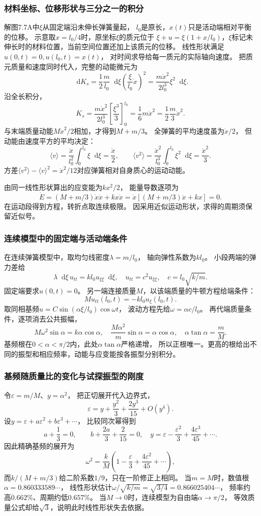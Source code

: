 \documentclass[UTF8,fontset=fandol,a4paper,11pt]{ctexart}
\newcommand{\dd}{\mathop{}\!\mathrm{d}}
\begin{document}
\subsubsection*{材料坐标、位移形状与三分之一的积分}
解图7.7A中$\xi$从固定端沿未伸长弹簧量起，
$l_0$是原长，$x(t)$只是活动端相对平衡的位移。
示意取$x=l_0/4$时，原坐标$\xi$的质元位于
$\xi+u=\xi(1+x/l_0)$，$\xi$标记未伸长时的材料位置，当前空间位置还加上该质元的位移。
线性形状满足$u(0,t)=0,u(l_0,t)=x(t)$，
对时间求导给每一质元的实际轴向速度。
把质元质量和速度同时代入，完整的动能微元为
\[
\dd K_s=\frac12\frac m{l_0}\dd\xi
\left(\frac\xi{l_0}\dot x\right)^2
=\frac{m\dot x^2}{2l_0^3}\xi^2\dd\xi.
\]
沿全长积分，
\[
K_s=\frac{m\dot x^2}{2l_0^3}
\left[\frac{\xi^3}{3}\right]_0^{l_0}
=\frac16m\dot x^2=\frac12\frac m3\dot x^2.
\]
与末端质量动能$M\dot x^2/2$相加，才得到$M+m/3$。
全弹簧的平均速度虽为$\dot x/2$，
但动能由速度平方的平均决定：
\[
\langle v\rangle=\frac{\dot x}{l_0^2}\int_0^{l_0}\xi\dd\xi=\frac{\dot x}{2},
\qquad
\langle v^2\rangle=\frac{\dot x^2}{l_0^3}\int_0^{l_0}\xi^2\dd\xi=\frac{\dot x^2}{3}.
\]
方差$\langle v^2\rangle-\langle v\rangle^2=\dot x^2/12$对应弹簧相对自身质心的运动动能。

由同一线性形状算出的应变能为$kx^2/2$，
能量导数逐项为
\[
\dot E=(M+m/3)\dot x\ddot x+kx\dot x
=\dot x[(M+m/3)\ddot x+kx]=0.
\]
在运动段得到方程，转折点取连续极限。
因采用近似运动形状，求得的周期须保留近似号。

\subsubsection*{连续模型中的固定端与活动端条件}
在连续弹簧模型中，取均匀线密度$\lambda=m/l_0$，
轴向弹性系数为$kl_0$。
小段两端的弹力差给
\[
\lambda\dd\xi\,u_{tt}=kl_0 u_{\xi\xi}\dd\xi,
\quad u_{tt}=c^2u_{\xi\xi},\quad
c=l_0\sqrt{k/m}.
\]
固定端要求$u(0,t)=0$。
另一端连接质量$M$，以该端质量的牛顿方程给端条件：
\[
M u_{tt}(l_0,t)=-kl_0 u_\xi(l_0,t).
\]
取同相基频$u=C\sin(\alpha\xi/l_0)\cos\omega t$，
波动方程先给$\omega=\alpha c/l_0$。
再代端质量条件，逐项消去公共振幅，
\[
M\omega^2\sin\alpha=k\alpha\cos\alpha,
\quad \frac{M\alpha^2}{m}\sin\alpha=\alpha\cos\alpha,
\quad \alpha\tan\alpha=\frac mM.
\]
基频根在$0<\alpha<\pi/2$内，此处$\alpha\tan\alpha$严格递增，
所以正根唯一。更高的根给出不同的振型和相应频率，动能与应变能按各振型分别积分。

\subsubsection*{基频随质量比的变化与试探振型的刚度}
令$\varepsilon=m/M$、$y=\alpha^2$，
把正切展开代入边界式，
\[
\varepsilon=y+\frac{y^2}{3}+\frac{2y^3}{15}+O(y^4).
\]
设$y=\varepsilon+a\varepsilon^2+b\varepsilon^3+\cdots$，
比较同次幂得到
\[
a+\frac13=0,\qquad b+\frac{2a}{3}+\frac{2}{15}=0,
\quad y=\varepsilon-\frac{\varepsilon^2}{3}+\frac{4\varepsilon^3}{45}+\cdots.
\]
因此精确基频的展开为
\[
\omega^2=\frac kM\left(1-\frac\varepsilon3+\frac{4\varepsilon^2}{45}+\cdots\right),
\]
而$k/(M+m/3)$给二阶系数$1/9$，只在一阶修正上相同。
当$m=M$时，数值根$\alpha=0.860333589\cdots$，
线性形状估计$\omega/\sqrt{k/m}=\sqrt{3/4}=0.866025404\cdots$，
频率约高$0.662\%$、周期约低$0.657\%$。
当$M\to0$时，连续模型为自由端$\alpha\to\pi/2$，
等效质量公式却给$\sqrt3$，说明此时线性形状失去依据。
\end{document}
